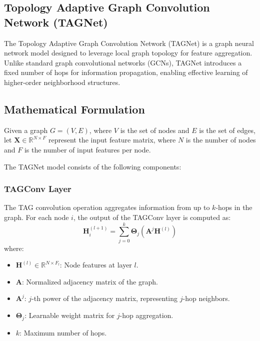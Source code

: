 

	
	\maketitle
	
	\subsection*{Topology Adaptive Graph Convolution Network (TAGNet)}
	The Topology Adaptive Graph Convolution Network (TAGNet) is a graph neural network model designed to leverage local graph topology for feature aggregation. Unlike standard graph convolutional networks (GCNs), TAGNet introduces a fixed number of hops for information propagation, enabling effective learning of higher-order neighborhood structures.
	
	\subsection*{Mathematical Formulation}
	
	Given a graph \( G = (V, E) \), where \( V \) is the set of nodes and \( E \) is the set of edges, let \( \mathbf{X} \in \mathbb{R}^{N \times F} \) represent the input feature matrix, where \( N \) is the number of nodes and \( F \) is the number of input features per node.
	
	The TAGNet model consists of the following components:
	
	\subsubsection*{TAGConv Layer}
	The TAG convolution operation aggregates information from up to \( k \)-hops in the graph. For each node \( i \), the output of the TAGConv layer is computed as:
	\[
	\mathbf{H}^{(l+1)}_i = \sum_{j=0}^{k} \mathbf{\Theta}_j (\mathbf{A}^j \mathbf{H}^{(l)})
	\]
	where:
	\begin{itemize}
		\item \( \mathbf{H}^{(l)} \in \mathbb{R}^{N \times F_l} \): Node features at layer \( l \).
		\item \( \mathbf{A} \): Normalized adjacency matrix of the graph.
		\item \( \mathbf{A}^j \): \( j \)-th power of the adjacency matrix, representing \( j \)-hop neighbors.
		\item \( \mathbf{\Theta}_j \): Learnable weight matrix for \( j \)-hop aggregation.
		\item \( k \): Maximum number of hops.
	\end{itemize}
	
